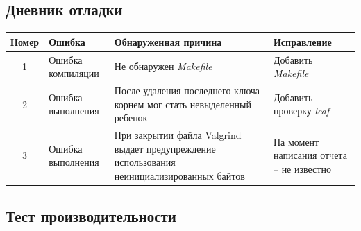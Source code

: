 \documentclass[12pt]{article}
\begin{document}
\subsection*{Дневник отладки}

\begin{center}
 \begin{tabular}{| c |p{4cm}|p{5cm}|p{4cm}|} 
 \hline
 Номер & Ошибка & Обнаруженная причина &  Исправление \\
 \hline\hline
 1 & Ошибка компиляции & Не обнаружен \textit{Makefile} & Добавить \textit{Makefile}  \\ 
 \hline
 2 & Ошибка выполнения & После удаления последнего ключа корнем мог стать невыделенный ребенок \textit{} & Добавить проверку \textit{leaf} \\
 \hline
 3 & Ошибка выполнения & При закрытии файла Valgrind выдает предупреждение использования неинициализированных байтов & На момент написания отчета \--- не известно \\
 \hline
\end{tabular}
\end{center}

\subsection*{Тест производительности}
\end{document}

